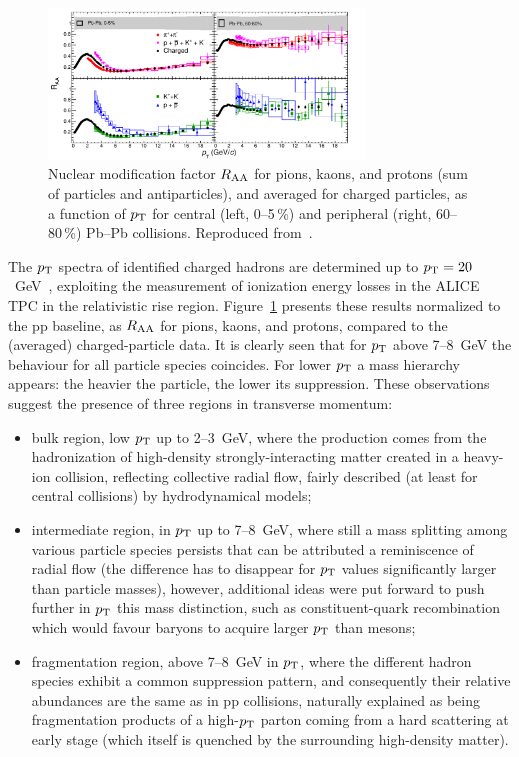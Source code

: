 \begin{figure}
\centering
\includegraphics[width=0.75\textwidth]{ksfigures/IdentHighPtRAA.pdf}
\caption{Nuclear modification factor $R_{\rm AA}$ for pions, kaons, and protons (sum of particles and antiparticles), and averaged for charged particles, as a function of $p_{\rm T}$ for central (left, 0--5\,\%) and peripheral (right, 60--80\,\%) Pb--Pb collisions. Reproduced from~\cite{Abelev:2014laa}.}
\label{figks:IdentPartRAA}
\end{figure}

The $p_{\rm T}$ spectra of identified charged hadrons are determined up to $p_{\rm T} = 20$~GeV~\cite{Abelev:2014laa}, exploiting the measurement of ionization energy losses in the ALICE TPC in the relativistic rise region. Figure~\ref{figks:IdentPartRAA} presents these results normalized to the pp baseline, as $R_{\rm AA}$ for pions, kaons, and protons, compared to the (averaged) charged-particle data. It is clearly seen that for $p_{\rm T}$ above 7--8~GeV the behaviour for all particle species coincides. For lower $p_{\rm T}$ a mass hierarchy appears: the heavier the particle, the lower its suppression. These observations suggest the presence of three regions in transverse momentum:
\begin{itemize}
    \item{bulk region, low $p_{\rm T}$ up to 2--3~GeV, where the production comes from the hadronization of high-density strongly-interacting matter created in a heavy-ion collision, reflecting collective radial flow, fairly described (at least for central collisions) by hydrodynamical models;}
    \item{intermediate region, in $p_{\rm T}$ up to 7--8~GeV, where still a mass splitting among various particle species persists that can be attributed a reminiscence of radial flow (the difference has to disappear for $p_{\rm T}$ values significantly larger than particle masses), however, additional ideas were put forward to push further in $p_{\rm T}$ this mass distinction, such as constituent-quark recombination~\cite{Hwa:2006zq} which would favour baryons to acquire larger $p_{\rm T}$ than mesons;}
    \item{fragmentation region, above 7--8~GeV in $p_{\rm T}$, where the different hadron species exhibit a common suppression pattern, and consequently their relative abundances are the same as in pp collisions, naturally explained as being fragmentation products of a high-$p_{\rm T}$ parton coming from a hard scattering at early stage (which itself is quenched by the surrounding high-density matter).}
\end{itemize}

